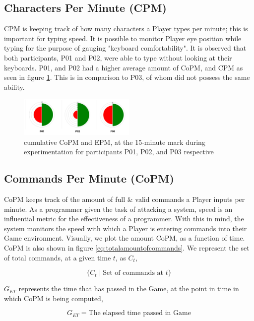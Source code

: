 \documentclass[10pt, titlepage, twocolumn]{article}
\newcommand{\ii}{\indent\indent}
\begin{document}
\subsection{Characters Per Minute (CPM)}
\ii
CPM is keeping track of how many characters a Player types per minute; this is important for typing speed. It is possible to monitor Player eye position while typing for the purpose of gauging "keyboard comfortability". It is observed that both participants, P01 and P02, were able to type without looking at their keyboards. P01, and P02 had a higher average amount of CoPM, and CPM as seen in figure \ref{playercomfort}. This is in comparison to P03, of whom did not possess the same ability.

\begin{figure}[ht]
\centering
	\includegraphics[width=0.5\textwidth]{playercomfort}
	\caption{cumulative CoPM and EPM, at the 15-minute mark during experimentation for participants P01, P02, and P03 respective}
	\label{playercomfort}
\end{figure}



\subsection{Commands Per Minute (CoPM)}
\ii
CoPM keeps track of the amount of full \& valid commands a Player inputs per minute. As a programmer given the task of attacking a system, speed is an influential metric for the effectiveness of a programmer. With this in mind, the system monitors the speed with which a Player is entering commands into their Game environment. Visually, we plot the amount CoPM, as a function of time. CoPM is also shown in figure \ref{eq:totalamountofcommands}. We represent the set of total commands, at a given time \(t\), as \(C_t\),


\begin{equation} 
\label{eq:totalamountofcommands}
	\{C_{t} \mid \text{Set of commands at } t \}
\end{equation}

\(G_{ET}\) represents the time that has passed in the Game, at the point in time in which CoPM is being computed,

\begin{equation} 
\label{eq:elapsedtime}
	G_{ET} = \text{The elapsed time passed in Game}
\end{equation}
\end{document}

